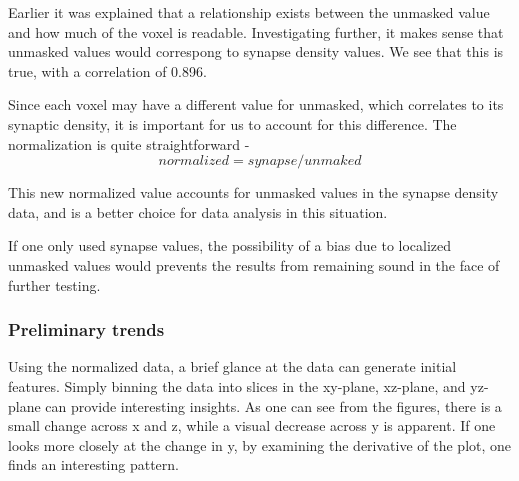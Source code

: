 \documentclass{article}
\begin{document}
Earlier it was explained that a relationship exists between the unmasked value and how much of the voxel is readable. Investigating further, it makes sense that unmasked values would correspong to synapse density values. We see that this is true, with a correlation of 0.896.

Since each voxel may have a different value for unmasked, which correlates to its synaptic density, it is important for us to account for this difference. The normalization is quite straightforward - \[normalized = synapse/unmaked \]

This new normalized value accounts for unmasked values in the synapse density data, and is a better choice for data analysis in this situation.

If one only used synapse values, the possibility of a bias due to localized unmasked values would prevents the results from remaining sound in the face of further testing.

\subsubsection{Preliminary trends}

Using the normalized data, a brief glance at the data can generate initial features. Simply binning the data into slices in the xy-plane, xz-plane, and yz-plane can provide interesting insights. As one can see from the figures, there is a small change across x and z, while a visual decrease across y is apparent. If one looks more closely at the change in y, by examining the derivative of the plot, one finds an interesting pattern.
\end{document}
